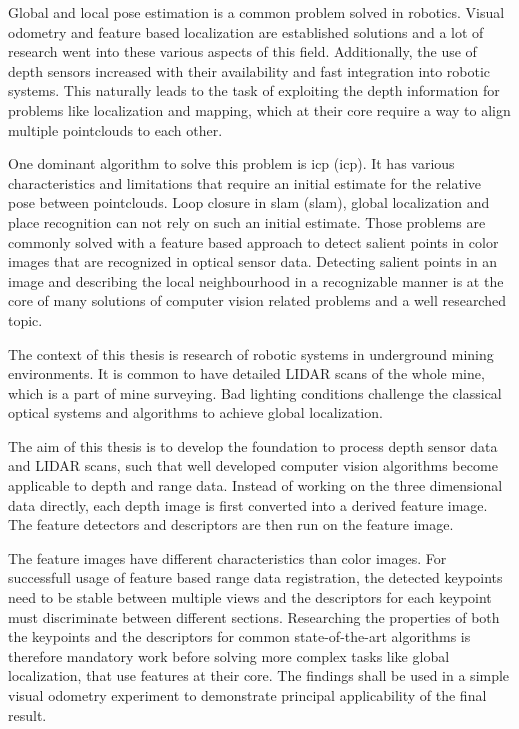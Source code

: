 Global and local pose estimation is a common problem solved in robotics.
Visual odometry\cite{he_tvc2019} and feature based localization\cite{sattler_cvpr2018} are established solutions and a lot of research went into these various aspects of this field.
Additionally, the use of depth sensors increased with their availability and fast integration into robotic systems.
This naturally leads to the task of exploiting the depth information for problems like localization and mapping, which at their core require a way to align multiple pointclouds to each other.

One dominant algorithm to solve this problem is \acrshort{icp} (\acrlong{icp})\cite{besl_pami1992}.
It has various characteristics and limitations that require an initial estimate for the relative pose between pointclouds.
Loop closure in \acrshort{slam} (\acrlong{slam})\cite{ho_ros2006}, global localization and place recognition\cite{sattler_2011} can not rely on such an initial estimate.
Those problems are commonly solved with a feature based approach to detect salient points in color images that are recognized in optical sensor data.
Detecting salient points in an image and describing the local neighbourhood in a recognizable manner is at the core of many solutions of computer vision related problems and a well researched topic.

The context of this thesis is research of robotic systems in underground mining environments.
It is common to have detailed \acrshort{LIDAR} scans of the whole mine, which is a part of mine surveying.
Bad lighting conditions challenge the classical optical systems and algorithms to achieve global localization.

The aim of this thesis is to develop the foundation to process depth sensor data and \acrshort{LIDAR} scans, such that well developed computer vision algorithms become applicable to depth and range data.
Instead of working on the three dimensional data directly, each depth image is first converted into a derived feature image.
The feature detectors and descriptors are then run on the feature image.

The feature images have different characteristics than color images.
For successfull usage of feature based range data registration, the detected keypoints need to be stable between multiple views and the descriptors for each keypoint must discriminate between different sections.
Researching the properties of both the keypoints and the descriptors for common state-of-the-art algorithms is therefore mandatory work before solving more complex tasks like global localization, that use features at their core.
The findings shall be used in a simple visual odometry experiment to demonstrate principal applicability of the final result.

